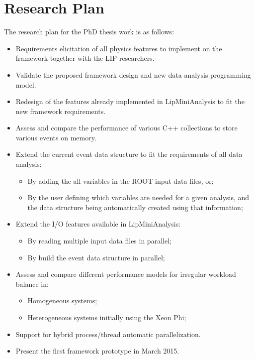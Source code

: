 \chapter{Research Plan}
\label{thesis_planning}


The research plan for the PhD thesis work is as follows:

\begin{itemize}
	\item Requirements elicitation of all physics features to implement on the framework together with the LIP researchers.
	\item Validate the proposed framework design and new data analysis programming model.
	\item Redesign of the features already implemented in LipMiniAnalysis to fit the new framework requirements.
	\item Assess and compare the performance of various C++ collections to store various events on memory.
	\item Extend the current event data structure to fit the requirements of all data analysis:
	\begin{itemize}
		\item By adding the all variables in the ROOT input data files, or;
		\item By the user defining which variables are needed for a given analysis, and the data structure being automatically created using that information;
	\end{itemize}
	\item Extend the I/O features available in LipMiniAnalysis:
	\begin{itemize}
		\item By reading multiple input data files in parallel;
		\item By build the event data structure in parallel;
	\end{itemize}
	\item Assess and compare different performance models for irregular workload balance in:
	\begin{itemize}
		\item Homogeneous systems;
		\item Heterogeneous systems initially using the \intel Xeon Phi;
	\end{itemize}
	\item Support for hybrid process/thread automatic parallelization.
	\item Present the first framework prototype in March 2015.
\end{itemize}

